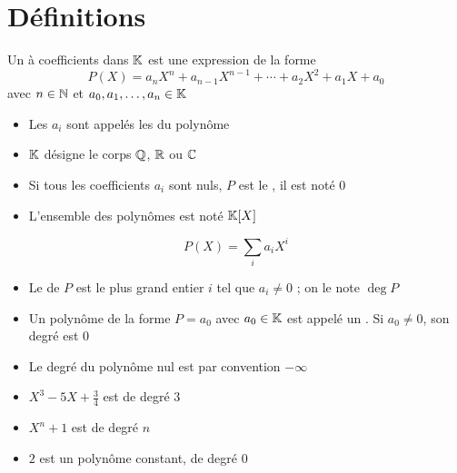 \section{Définitions}

\begin{frame}
\centerline{}


Un  à coefficients dans $\mathbb{K}$ 
est une expression de la forme
$$P(X) = a_n X^n + a_{n-1} X^{n-1} + \cdots + a_2 X^2 + a_1 X + a_0$$
avec $n\in \mathbb{N}$ et $a_0,a_1,\ldots,a_n \in \mathbb{K}$

\pause

\begin{itemize}[<+->]
  \item Les $a_i$ sont appelés les  du polynôme
  
  \item $\mathbb{K}$ désigne le corps $\mathbb{Q}$, $\mathbb{R}$ ou $\mathbb{C}$

  \item Si tous les coefficients $a_i$ sont nuls, $P$ est le , il est noté $0$ 
  
  \item L'ensemble des polynômes est noté $\mathbb{K}[X]$
  
\end{itemize} 
  
\end{frame}


\begin{frame}
$$P(X)= \sum_i a_i X^i$$
\begin{itemize}
  \item  Le  de $P$ est le plus grand entier $i$ tel que $a_i\neq0$ ;
on le note $\deg P$

\pause

  \item Un polynôme de la forme $P=a_0$ avec $a_0\in\mathbb{K}$ est appelé un 
  . Si $a_0 \neq 0$, son degré est $0$

\pause

  \item Le degré du polynôme nul est par convention $-\infty$
\end{itemize}

\pause

\begin{exemple}
\begin{itemize}
  \item $X^3-5X+\frac 34$ est  de degré $3$
  \item $X^n+1$ est  de degré $n$
  \item $2$ est un polynôme constant, de degré $0$ 
\end{itemize}
\end{exemple}
\end{frame}


